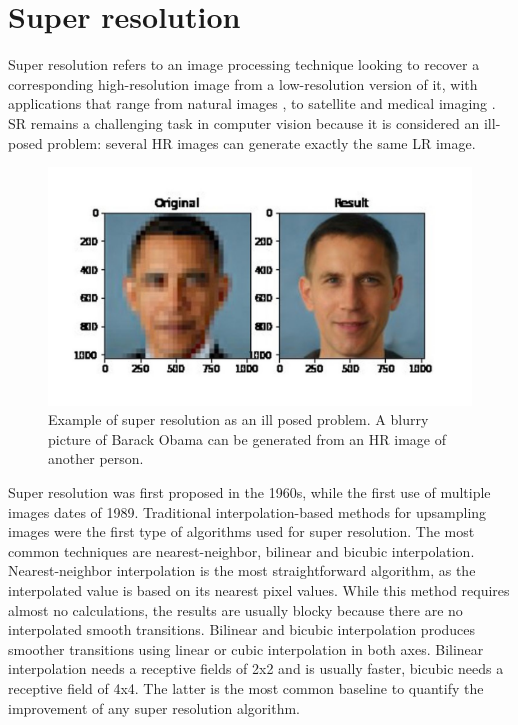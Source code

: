 \section{Super resolution} \label{sec:SR}

    Super resolution refers to an image processing technique looking to recover a corresponding high-resolution image from a low-resolution version of it, with applications that range from natural images \cite{zeyde2010single}, \cite{martin2001database} to satellite \cite{valsesia2021permutation} and medical imaging \cite{bashir2021comprehensive}. SR remains a challenging task in computer vision because it is considered an ill-posed problem: several HR images can generate exactly the same LR image. 

       \begin{figure}[H]
            \centering
            \includegraphics[width=\textwidth]{Includes/2-SR-ill-posed.jpg}
            \caption{Example of super resolution as an ill posed problem. A blurry picture of Barack Obama can be generated from an HR image of another person.}
            \label{fig:2-SR-ill-posed}
        \end{figure}
    
    Super resolution was first proposed in the 1960s, while the first use of multiple images dates of 1989. 
    Traditional interpolation-based methods for upsampling images were the first type of algorithms used for super resolution.
    The most common techniques are nearest-neighbor, bilinear and bicubic interpolation.
    Nearest-neighbor interpolation is the most straightforward algorithm, as the interpolated value is based on its nearest pixel values. 
    While this method requires almost no calculations, the results are usually blocky because there are no interpolated smooth transitions.
    Bilinear and bicubic interpolation produces smoother transitions using linear or cubic interpolation in both axes. 
    Bilinear interpolation needs a receptive fields of 2x2 and is usually faster, bicubic needs a receptive field of 4x4. 
    The latter is the most common baseline to quantify the improvement of any super resolution algorithm. 

